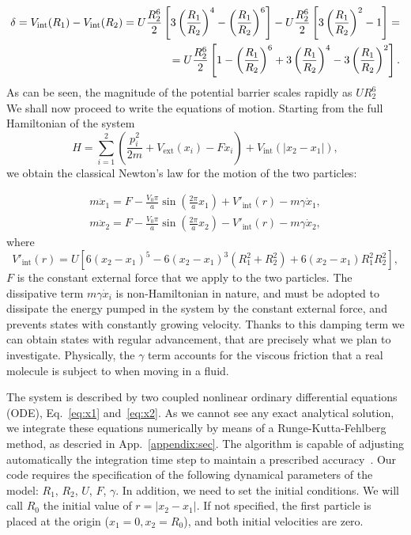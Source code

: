 \begin{align}
    \notag
    \delta = V_\text{int}(R_1) - V_\text{int}(R_2) = U\frac{R_2^6}{2}\left[ 3\left(\frac{R_1}{R_2}\right)^4 -  \left(\frac{R_1}{R_2}\right)^6 \right]
    -U\frac{R_2^6}{2}\left[ 3\left(\frac{R_1}{R_2}\right)^2 - 1\right] = \\
     = U\frac{R_2^6}{2}\left[ 1 -  \left(\frac{R_1}{R_2}\right)^6 + 3\left(\frac{R_1}{R_2}\right)^4  - 3\left(\frac{R_1}{R_2}\right)^2 \right].
    \label{eq:delta}
\end{align}
As can be seen, the magnitude of the potential barrier scales rapidly as $UR_2^6$\\


We shall now proceed to write the equations of motion. Starting from the full Hamiltonian of the system
\begin{equation}
    H = \sum_{i=1}^2 \left( \frac{p_{i}^2}{2m} + V_\text{ext}(x_i) - Fx_i \right) + V_\text{int}(|x_2 - x_1|),
\end{equation}
we obtain the classical Newton's law for the motion of the two particles:

\begin{align} 
    m \ddot{x}_{1}=F-\frac{V_{0} \pi}{a} \sin \left(\frac{2 \pi}{a} x_{1}\right)+ V'_\text{int}(r)-m \gamma \dot{x}_{1} \label{eq:x1},\\
    m \ddot{x}_{2}=F-\frac{V_{0} \pi}{a} \sin \left(\frac{2 \pi}{a} x_{2}\right)- V'_\text{int}(r)-m \gamma \dot{x}_{2}
    \label{eq:x2},
\end{align}
where 
\begin{equation}
    V'_\text{int}(r) = U\left[6\left(x_{2}-x_{1}\right)^{5}-6\left(x_{2}-x_{1}\right)^{3}\left(R_{1}^{2}+R_{2}^{2}\right)+6\left(x_{2}-x_{1}\right) R_{1}^{2} R_{2}^{2}\right],
\end{equation}
$F$ is the constant external force that we apply to the two particles. The dissipative term $m\gamma \dot{x}_{i}$ is non-Hamiltonian in nature, and must be adopted to dissipate the energy pumped in the system by the constant external force, and prevents states with constantly growing velocity. Thanks to this damping term we can obtain states with regular advancement, that are precisely what we plan to investigate. Physically, the $\gamma$ term accounts for the viscous friction that a real molecule is subject to when moving in a fluid.

The system is described by two coupled nonlinear ordinary differential equations (ODE), Eq.~\eqref{eq:x1} and~\eqref{eq:x2}. As we cannot see any exact analytical solution, we integrate these equations numerically by means of a Runge-Kutta-Fehlberg method, as descried in App.~\ref{appendix:sec}. The algorithm is capable of adjusting automatically the integration time step to maintain a prescribed accuracy~\cite{RKF45,RKF45_b}. Our code requires the specification of the following dynamical parameters of the model:
$R_1$, $R_2$, $U$, $F$, $\gamma$.
In addition, we need to set the initial conditions. We will call $R_0$ the initial value of $r =|x_2 - x_1|$. If not specified, the first particle is placed at the origin ($x_1=0, x_2 = R_0$), and both initial velocities are zero. 
